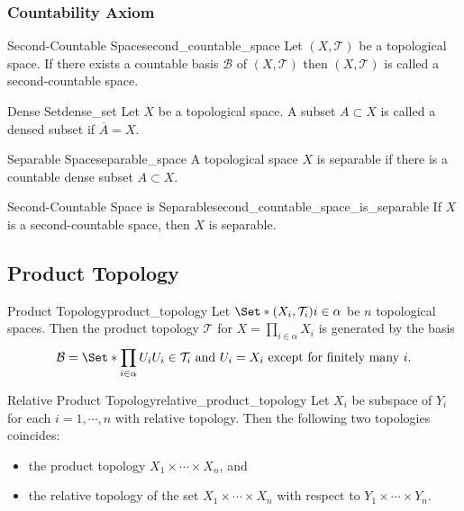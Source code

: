 \documentclass{article}
\begin{document}
\subsubsection{Countability Axiom}

\begin{definition}{Second-Countable Space}{second_countable_space}
    Let $(X,\mathcal{T})$ be a topological space.
    If there exists a countable basis $\mathcal{B}$ of $(X,\mathcal{T})$ then $(X,\mathcal{T})$ is called a second-countable space.
\end{definition}

\begin{definition}{Dense Set}{dense_set}
    Let $X$ be a topological space.
    A subset $A\subset X$ is called a densed subset if $\overline{A} = X$.
\end{definition}

\begin{definition}{Separable Space}{separable_space}
    A topological space $X$ is separable if there is a countable dense subset $A\subset X$.
\end{definition}

\begin{theorem}{Second-Countable Space is Separable}{second_countable_space_is_separable}
    If $X$ is a second-countable space, then $X$ is separable.
\end{theorem}

\subsection{Product Topology}

\begin{definition}{Product Topology}{product_topology}
    Let $\Set*{(X_i,\mathcal{T}_i)}{i\in\alpha}$ be $n$ topological spaces.
    Then the product topology $\mathcal{T}$ for $X = \prod_{i\in\alpha} X_i$ is generated by the basis
    \[ \mathcal{B} = \Set*{\prod_{i\in\alpha} U_i}{U_i\in\mathcal{T}_i \text{ and } U_i = X_i \text{ except for finitely many } i}. \]
\end{definition}

\begin{theorem}{Relative Product Topology}{relative_product_topology}
    Let $X_i$ be subspace of $Y_i$ for each $i=1,\cdots,n$ with relative topology.
    Then the following two topologies coincides:
    \begin{itemize}
        \item the product topology $X_1 \times \cdots \times X_n$, and
        \item the relative topology of the set $X_1 \times \cdots \times X_n$ with respect to $Y_1 \times \cdots \times Y_n$.
    \end{itemize}
\end{theorem}
\end{document}
